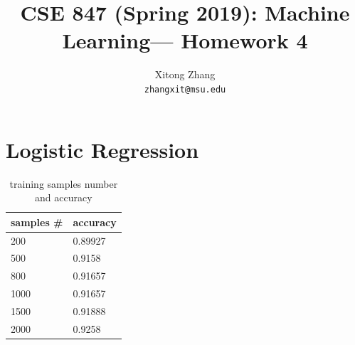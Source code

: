 \documentclass{article}
\title{CSE 847 (Spring 2019): Machine Learning— Homework 4} %
\author{Xitong Zhang\\ \texttt{zhangxit@msu.edu}}
\date{}
\begin{document}
\maketitle %
\section{Logistic Regression} 
\begin{table}[h!]
	\centering
	\begin{tabular}{ll}
	\multicolumn{1}{c}{samples \#} & \multicolumn{1}{c}{accuracy} \\
	\hline
	200 & 0.89927    \\  
	500 & 0.9158     \\ 
	800 & 0.91657 	 \\
	1000 & 0.91657   \\
	1500 & 0.91888   \\   
	2000 & 0.9258    
	\end{tabular}
	\caption{training samples number and accuracy}
\end{table}
\end{document}
